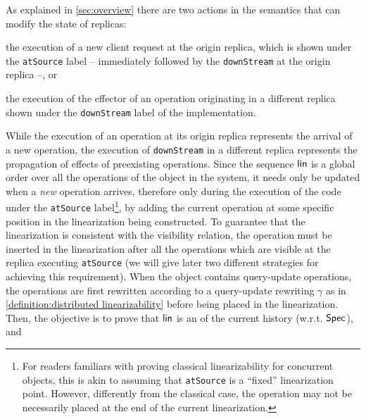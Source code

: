 As explained in \autoref{sec:overview} there are two actions in the
semantics that can modify the state of replicas:
\begin{inparaenum}
\item the execution of a new client request at the origin replica,
  which is shown under the \lstinline|atSource| label -- immediately
  followed by the \lstinline|downStream| at the origin replica
  --, or
\item the execution of the effector of an operation originating in a
  different replica shown under the \lstinline|downStream| label of
  the implementation.
\end{inparaenum}
%
While the execution of an operation at its origin replica represents
the arrival of a new operation, the execution of 
\lstinline|downStream| in a different replica represents the
propagation of effects of preexisting operations.
%
Since the sequence $\mathsf{lin}$ is a global order over all the
operations of the object in the system, it needs only be updated when
a \emph{new} operation arrives, therefore only during the execution of the code under the
\lstinline|atSource| label\footnote{For readers familiars with proving classical
  linearizability for concurrent objects, this is akin to assuming that
  \lstinline|atSource| is a ``fixed'' linearization point.
  However, differently from the classical case, the operation may not
  be necessarily placed at the end of the current linearization.},
by adding the current operation at some specific position in the
linearization being constructed.
%
%
To guarantee that the linearization is consistent with the visibility
relation, the operation must be inserted in the linearization after
all the operations which are visible at the replica executing
\lstinline|atSource| (we will give later two different strategies for achieving this requirement).
When the object contains query-update operations, the operations are
first rewritten according to a query-update rewriting $\gamma$ as in
\autoref{definition:distributed linearizability} before being placed
in the linearization.
Then, the objective is to prove that $\mathsf{lin}$ is an
\crdtlinearization{} of the current history (w.r.t. $\mathsf{Spec}{}$), and
